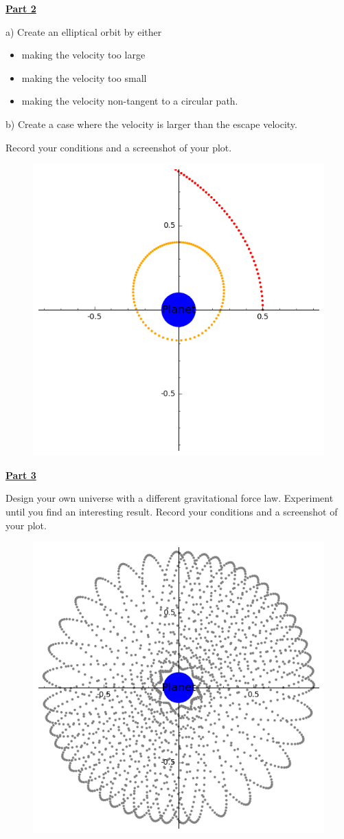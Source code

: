 \documentclass[12pt]{article}
\begin{document}
\underline{\textbf{Part 2}} \par
a) Create an elliptical orbit by either
\begin{itemize}
\item making the velocity too large
\item making the velocity too small
\item making the velocity non-tangent to a circular path.
\end{itemize}
b) Create a case where the velocity is larger than the escape velocity.

Record your conditions and a screenshot of your plot.
%
\begin{figure}[H]
\includegraphics[scale=0.60]{figures/part2.png}
\end{figure}

\underline{\textbf{Part 3}} \par
Design your own universe with a different gravitational force law.
Experiment until you find an interesting result.
Record your conditions and a screenshot of your plot.
%
\begin{figure}[H]
\includegraphics[scale=0.60]{figures/part3.png}
\end{figure}
\end{document}
